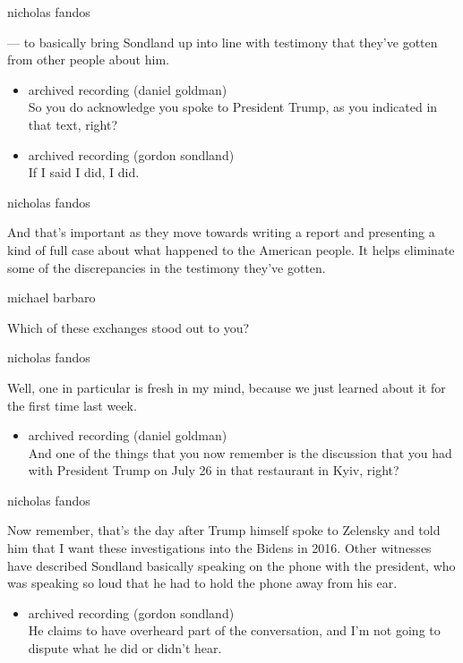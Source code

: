 nicholas fandos

--- to basically bring Sondland up into line with testimony that they've
gotten from other people about him.

\begin{itemize}
\item
  archived recording (daniel goldman)\\
  So you do acknowledge you spoke to President Trump, as you indicated
  in that text, right?
\item
  archived recording (gordon sondland)\\
  If I said I did, I did.
\end{itemize}

nicholas fandos

And that's important as they move towards writing a report and
presenting a kind of full case about what happened to the American
people. It helps eliminate some of the discrepancies in the testimony
they've gotten.

michael barbaro

Which of these exchanges stood out to you?

nicholas fandos

Well, one in particular is fresh in my mind, because we just learned
about it for the first time last week.

\begin{itemize}
\tightlist
\item
  archived recording (daniel goldman)\\
  And one of the things that you now remember is the discussion that you
  had with President Trump on July 26 in that restaurant in Kyiv, right?
\end{itemize}

nicholas fandos

Now remember, that's the day after Trump himself spoke to Zelensky and
told him that I want these investigations into the Bidens in 2016. Other
witnesses have described Sondland basically speaking on the phone with
the president, who was speaking so loud that he had to hold the phone
away from his ear.

\begin{itemize}
\tightlist
\item
  archived recording (gordon sondland)\\
  He claims to have overheard part of the conversation, and I'm not
  going to dispute what he did or didn't hear.
\end{itemize}


